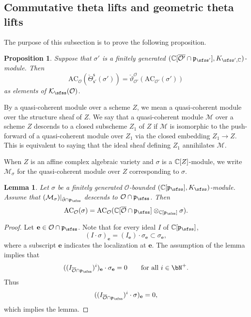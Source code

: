 \documentclass[12pt,a4paper]{amsart}
\newcommand{\CK}{{\mathcal {K}}}
\newcommand{\CM}{{\mathcal {M}}}
\newcommand{\CO}{{\mathcal {O}}}
\newcommand{\p}{\mathfrak p}
\numberwithin{equation}{section}
\newtheorem{lem}[thm]{Lemma}
\newtheorem{prop}[thm]{Proposition}
\theoremstyle{remark}
\begin{document}
\subsection{Commutative theta lifts and  geometric theta lifts}

The purpose of this subsection is to prove the following proposition.
\begin{prop}\label{propthetag}
Suppose that $\sigma'$ is a finitely generated  $(\C[\overline{\CO'}\cap \p_{\sfss'}], K_{\sfss', \C})$-module. Then
\[
\mathrm{AC}_{\CO}( \check \Theta_{\mathsf s'}^{\mathsf s}(\sigma'))= \check \vartheta_{\CO'}^{\CO}(\mathrm{AC}_{\CO'}(\sigma'))
\]
as elements of $\CK_\sfss(\CO)$.

\end{prop}


By a quasi-coherent module over a scheme $Z$, we mean a quasi-coherent module over the structure sheaf of $Z$. We say that a quasi-coherent module $\CM$ over a scheme $Z$ descends to a closed subscheme $Z_1$ of $Z$ if $\CM$ is isomorphic to the push-forward of a
 quasi-coherent module over $Z_1$ via the closed embedding $Z_1\rightarrow Z$. This is equivalent to saying that the ideal sheaf defining $Z_1$ annihilates $\CM$.

When $Z$ is an affine complex algebraic variety and $\sigma$ is a $\mathbb{C}[Z]$-module,
 we write $\CM_\sigma$ for  the quasi-coherent module over $Z$ corresponding to $\sigma$.

\begin{lem}\label{geotheta1}
Let $\sigma$ be a finitely generated $\CO$-bounded $(\C[\p_{\sfss}],K_{\sfss})$-module.  Assume that  $(\CM_\sigma)|_{\bar \partial\cap \p_\sfss}$ descends to $\CO\cap \p_\sfss$. Then
\[
  \mathrm{AC}_{\CO}(\sigma)=\mathrm{AC}_{\CO}(\C[\overline \CO\cap \p_{\sfss}]\otimes_{\C[\p_{\sfss}]} \sigma).
\]
\end{lem}
\begin{proof}
Let $\mathbf e\in \CO\cap \p_\sfss$. Note that for every ideal $I$ of $\C[\p_{\sfss}]$,
\[
  (I\cdot \sigma)_\mathbf e=(I_\mathbf e)\cdot \sigma_\mathbf e\subset  \sigma_\mathbf e,
\]
where a subscript $\mathbf e$ indicates the localization at $\mathbf e$. The assumption of the lemma implies that
\[
  ((I_{\overline{\CO}\cap \p_\sfss})^i)_\mathbf e \cdot \sigma_\mathbf e=0\qquad \textrm{for all } i\in \bN^+.
\]
Thus
\[
  ((I_{\overline{\CO}\cap \p_\sfss})^i \cdot \sigma)_\mathbf e=0,
\]
which implies the  lemma.
\end{proof}
\end{document}
